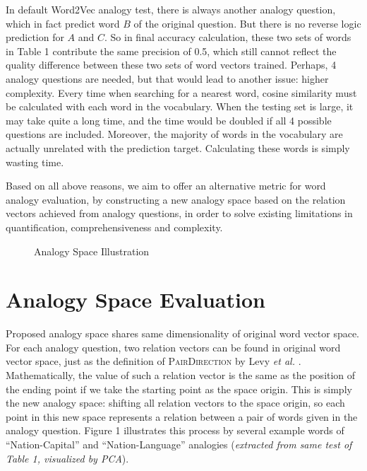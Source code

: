 \documentclass[11pt,letterpaper]{article}
\begin{document}
In default Word2Vec analogy test, there is always another analogy question, which in fact predict word $B$ of the original question. But there is no reverse logic prediction for $A$ and $C$. So in final accuracy calculation, these two sets of words in Table 1 contribute the same precision of 0.5, which still cannot reflect the quality difference between these two sets of word vectors trained. Perhaps, 4 analogy questions are needed, but that would lead to another issue: higher complexity. Every time when searching for a nearest word, cosine similarity must be calculated with each word in the vocabulary. When the testing set is large, it may take quite a long time, and the time would be doubled if all 4 possible questions are included. Moreover, the majority of words in the vocabulary are actually unrelated with the prediction target. Calculating these words is simply wasting time.

Based on all above reasons, we aim to offer an alternative metric for word analogy evaluation, by constructing a new analogy space based on the relation vectors achieved from analogy questions, in order to solve existing limitations in quantification, comprehensiveness and complexity.

\begin{figure}[!ht]
\centering
{}


\caption{Analogy Space Illustration}
\end{figure}

\section{Analogy Space Evaluation}

Proposed analogy space shares same dimensionality of original word vector space. For each analogy question, two relation vectors can be found in original word vector space, just as the definition of \textsc{PairDirection} by Levy \textit{et al.} . Mathematically, the value of such a relation vector is the same as the position of the ending point if we take the starting point as the space origin. This is simply the new analogy space: shifting all relation vectors to the space origin, so each point in this new space represents a relation between a pair of words given in the analogy question. Figure 1 illustrates this process by several example words of ``Nation-Capital'' and ``Nation-Language'' analogies (\textit{extracted from same test of Table 1, visualized by PCA}).
\end{document}
